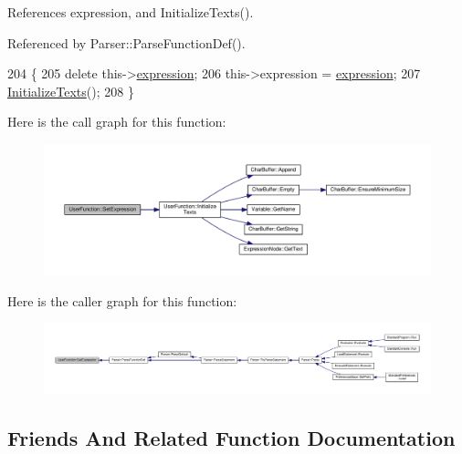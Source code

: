References expression, and Initialize\+Texts().



Referenced by Parser\+::\+Parse\+Function\+Def().


\begin{DoxyCode}
204 \{
205     \textcolor{keyword}{delete} this->\hyperlink{classUserFunction_ab7a0fb4f1265946883ef4e52dbe032f7}{expression};
206     this->expression = \hyperlink{classUserFunction_ab7a0fb4f1265946883ef4e52dbe032f7}{expression};
207     \hyperlink{classUserFunction_a5f22a558f8418f2ef6df952d88c7029b}{InitializeTexts}();
208 \}
\end{DoxyCode}


Here is the call graph for this function\+:\nopagebreak
\begin{figure}[H]
\begin{center}
\leavevmode
\includegraphics[width=350pt]{classUserFunction_ab033663735b65ce885eefd63e6208c24_cgraph}
\end{center}
\end{figure}




Here is the caller graph for this function\+:\nopagebreak
\begin{figure}[H]
\begin{center}
\leavevmode
\includegraphics[width=350pt]{classUserFunction_ab033663735b65ce885eefd63e6208c24_icgraph}
\end{center}
\end{figure}




\subsection{Friends And Related Function Documentation}
